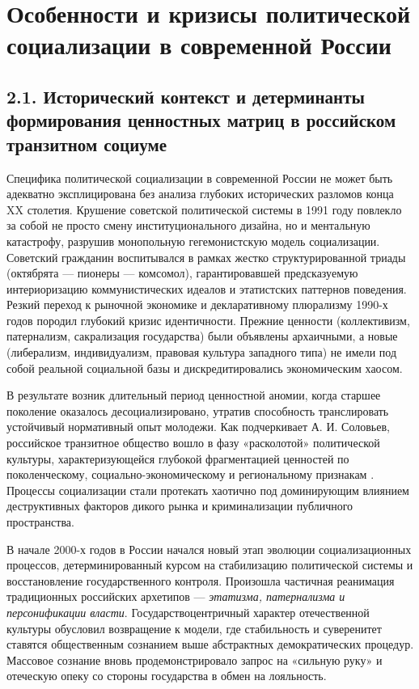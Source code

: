 \section{Особенности и кризисы политической социализации в современной России}

\subsection{2.1. Исторический контекст и детерминанты формирования ценностных матриц в российском транзитном социуме}

Специфика политической социализации в современной России не может быть адекватно эксплицирована без анализа глубоких исторических разломов конца XX столетия. Крушение советской политической системы в 1991 году повлекло за собой не просто смену институционального дизайна, но и ментальную катастрофу, разрушив монопольную гегемонистскую модель социализации. Советский гражданин воспитывался в рамках жестко структурированной триады (октябрята --- пионеры --- комсомол), гарантировавшей предсказуемую интериоризацию коммунистических идеалов и этатистских паттернов поведения. Резкий переход к рыночной экономике и декларативному плюрализму 1990-х годов породил глубокий кризис идентичности. Прежние ценности (коллективизм, патернализм, сакрализация государства) были объявлены архаичными, а новые (либерализм, индивидуализм, правовая культура западного типа) не имели под собой реальной социальной базы и дискредитировались экономическим хаосом. 

В результате возник длительный период ценностной аномии, когда старшее поколение оказалось десоциализировано, утратив способность транслировать устойчивый нормативный опыт молодежи. Как подчеркивает А. И. Соловьев, российское транзитное общество вошло в фазу «расколотой» политической культуры, характеризующейся глубокой фрагментацией ценностей по поколенческому, социально-экономическому и региональному признакам \cite{Solovyev}. Процессы социализации стали протекать хаотично под доминирующим влиянием деструктивных факторов дикого рынка и криминализации публичного пространства.

В начале 2000-х годов в России начался новый этап эволюции социализационных процессов, детерминированный курсом на стабилизацию политической системы и восстановление государственного контроля. Произошла частичная реанимация традиционных российских архетипов — \textit{этатизма, патернализма и персонификации власти}. Государствоцентричный характер отечественной культуры обусловил возвращение к модели, где стабильность и суверенитет ставятся общественным сознанием выше абстрактных демократических процедур. Массовое сознание вновь продемонстрировало запрос на «сильную руку» и отеческую опеку со стороны государства в обмен на лояльность. 

